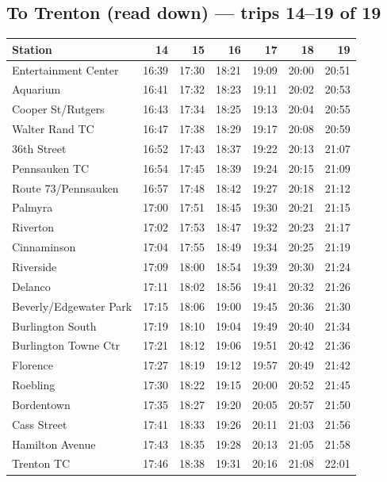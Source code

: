 \subsection*{To Trenton (read down) --- trips 14--19 of 19}
\begin{center}\footnotesize\setlength{\tabcolsep}{3pt}\begin{tabular}{@{}lrrrrrr@{}}\toprule
Station & 14 & 15 & 16 & 17 & 18 & 19 \\\midrule
Entertainment Center & 16:39 & 17:30 & 18:21 & 19:09 & 20:00 & 20:51 \\
Aquarium & 16:41 & 17:32 & 18:23 & 19:11 & 20:02 & 20:53 \\
Cooper St/Rutgers & 16:43 & 17:34 & 18:25 & 19:13 & 20:04 & 20:55 \\
Walter Rand TC & 16:47 & 17:38 & 18:29 & 19:17 & 20:08 & 20:59 \\
36th Street & 16:52 & 17:43 & 18:37 & 19:22 & 20:13 & 21:07 \\
Pennsauken TC & 16:54 & 17:45 & 18:39 & 19:24 & 20:15 & 21:09 \\
Route 73/Pennsauken & 16:57 & 17:48 & 18:42 & 19:27 & 20:18 & 21:12 \\
Palmyra & 17:00 & 17:51 & 18:45 & 19:30 & 20:21 & 21:15 \\
Riverton & 17:02 & 17:53 & 18:47 & 19:32 & 20:23 & 21:17 \\
Cinnaminson & 17:04 & 17:55 & 18:49 & 19:34 & 20:25 & 21:19 \\
Riverside & 17:09 & 18:00 & 18:54 & 19:39 & 20:30 & 21:24 \\
Delanco & 17:11 & 18:02 & 18:56 & 19:41 & 20:32 & 21:26 \\
Beverly/Edgewater Park & 17:15 & 18:06 & 19:00 & 19:45 & 20:36 & 21:30 \\
Burlington South & 17:19 & 18:10 & 19:04 & 19:49 & 20:40 & 21:34 \\
Burlington Towne Ctr & 17:21 & 18:12 & 19:06 & 19:51 & 20:42 & 21:36 \\
Florence & 17:27 & 18:19 & 19:12 & 19:57 & 20:49 & 21:42 \\
Roebling & 17:30 & 18:22 & 19:15 & 20:00 & 20:52 & 21:45 \\
Bordentown & 17:35 & 18:27 & 19:20 & 20:05 & 20:57 & 21:50 \\
Cass Street & 17:41 & 18:33 & 19:26 & 20:11 & 21:03 & 21:56 \\
Hamilton Avenue & 17:43 & 18:35 & 19:28 & 20:13 & 21:05 & 21:58 \\
Trenton TC & 17:46 & 18:38 & 19:31 & 20:16 & 21:08 & 22:01 \\
\bottomrule\end{tabular}\end{center}
